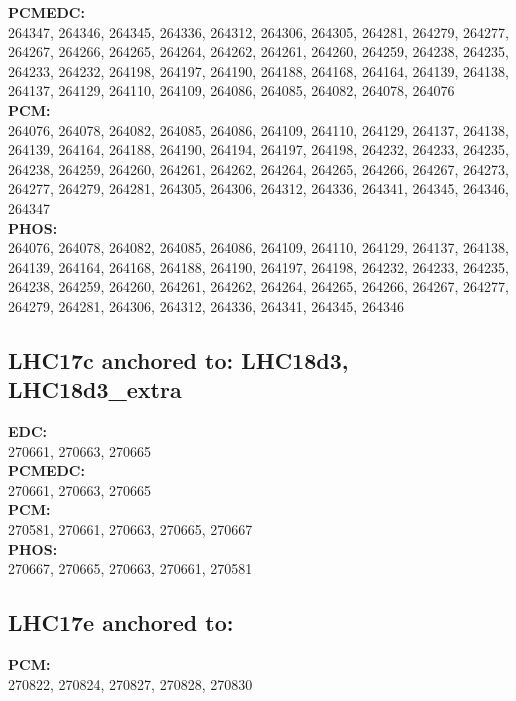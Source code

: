  \textbf{PCMEDC:}\\
264347, 264346, 264345, 264336, 264312, 264306, 264305, 264281, 264279, 264277, 264267, 264266, 264265, 264264, 264262, 264261, 264260, 264259, 264238, 264235, 264233, 264232, 264198, 264197, 264190, 264188, 264168, 264164, 264139, 264138, 264137, 264129, 264110, 264109, 264086, 264085, 264082, 264078, 264076\\

 \textbf{PCM:}\\
264076, 264078, 264082, 264085, 264086, 264109, 264110, 264129, 264137, 264138, 264139, 264164, 264188, 264190, 264194, 264197, 264198, 264232, 264233, 264235, 264238, 264259, 264260, 264261, 264262, 264264, 264265, 264266, 264267, 264273, 264277, 264279, 264281, 264305, 264306, 264312, 264336, 264341, 264345, 264346, 264347\\

 \textbf{PHOS:}\\
264076, 264078, 264082, 264085, 264086, 264109, 264110, 264129, 264137, 264138, 264139, 264164, 264168, 264188, 264190, 264197, 264198, 264232, 264233, 264235, 264238, 264259, 264260, 264261, 264262, 264264, 264265, 264266, 264267, 264277, 264279, 264281, 264306, 264312, 264336, 264341, 264345, 264346\\

 \subsection{LHC17c anchored to: LHC18d3, LHC18d3\_extra}

 \textbf{EDC:}\\
270661, 270663, 270665\\

 \textbf{PCMEDC:}\\
270661, 270663, 270665\\

 \textbf{PCM:}\\
270581, 270661, 270663, 270665, 270667\\

 \textbf{PHOS:}\\
270667, 270665, 270663, 270661, 270581\\

 \subsection{LHC17e anchored to:  }

 \textbf{PCM:}\\
270822, 270824, 270827, 270828, 270830\\

